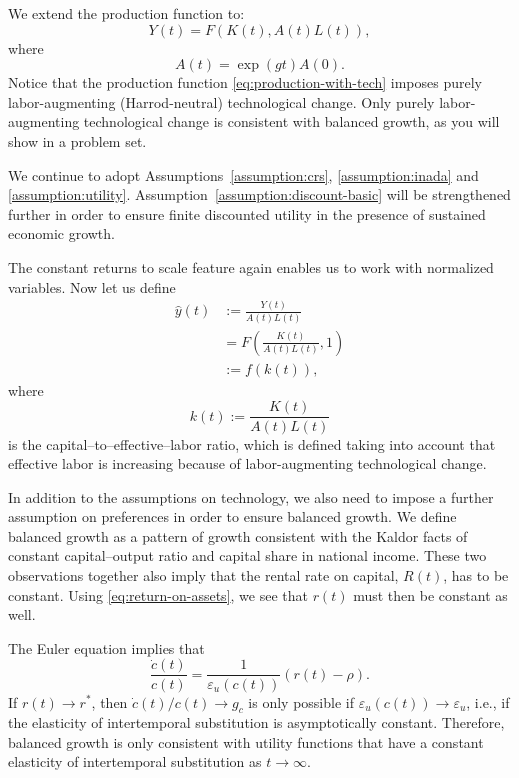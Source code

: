 \documentclass[\topdir/lecture\_notes.tex]{subfiles}
\begin{document}
We extend the production function to:
\begin{equation}
  Y(t)=F(K(t), A(t) L(t)),
  \label{eq:production-with-tech}
\end{equation}
where
\[
  A(t)=\exp(g t) A(0).
\]
Notice that the production function \eqref{eq:production-with-tech} imposes purely labor-augmenting (Harrod-neutral) technological change.
Only purely labor-augmenting technological change is consistent with balanced growth, as you will show in a problem set.

We continue to adopt Assumptions~\ref{assumption:crs}, \ref{assumption:inada} and \ref{assumption:utility}.
Assumption~\ref{assumption:discount-basic} will be strengthened further in order to ensure finite discounted utility in the presence of sustained economic growth.

The constant returns to scale feature again enables us to work with normalized variables.
Now let us define
\[
  \begin{aligned}
    \hat{y}(t) & := \frac{Y(t)}{A(t) L(t)}                \\
               & =F\left(\frac{K(t)}{A(t) L(t)}, 1\right) \\
               & := f(k(t)),
  \end{aligned}
\]
where
\[
  k(t) := \frac{K(t)}{A(t) L(t)}
\]
is the capital--to--effective--labor ratio, which is defined taking into account that effective labor is increasing because of labor-augmenting technological change.

In addition to the assumptions on technology, we also need to impose a further assumption on preferences in order to ensure balanced growth.
We define balanced growth as a pattern of growth consistent with the Kaldor facts of constant capital--output ratio and capital share in national income.
These two observations together also imply that the rental rate on capital, \(R(t)\), has to be constant.
Using \eqref{eq:return-on-assets}, we see that \(r(t)\) must then be constant as well.

The Euler equation implies that
\[
  \frac{\dot{c}(t)}{c(t)}=\frac{1}{\varepsilon_{u}(c(t))}(r(t)-\rho).
\]
If \(r(t) \rightarrow r^{*}\), then \(\dot{c}(t) / c(t) \rightarrow g_{c}\) is only possible if \(\varepsilon_{u}(c(t)) \rightarrow \varepsilon_{u}\), i.e., if the elasticity of intertemporal substitution is asymptotically constant.
Therefore, balanced growth is only consistent with utility functions that have a constant elasticity of intertemporal substitution as \(t \rightarrow \infty\).
\end{document}
